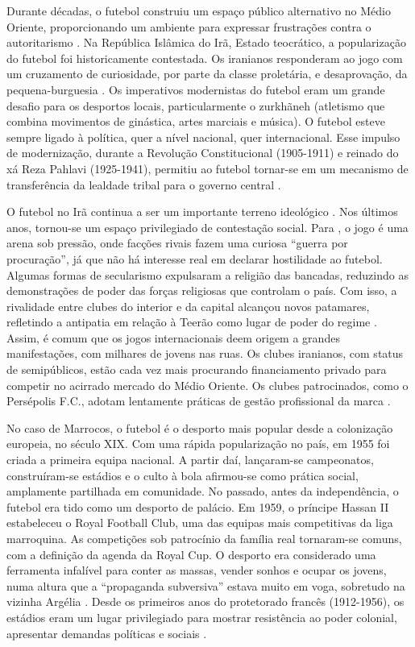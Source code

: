 \documentclass{textolivre}
\begin{document}
Durante décadas, o futebol construiu um espaço público alternativo no Médio Oriente, proporcionando um ambiente para expressar frustrações contra o autoritarismo \cite{dorsey2016}. Na República Islâmica do Irã, Estado teocrático, a popularização do futebol foi historicamente contestada. Os iranianos responderam ao jogo com um cruzamento de curiosidade, por parte da classe proletária, e desaprovação, da pequena-burguesia \cite{fozooni2004}. Os imperativos modernistas do futebol eram um grande desafio para os desportos locais, particularmente o zurkhãneh (atletismo que combina movimentos de ginástica, artes marciais e música). O futebol esteve sempre ligado à política, quer a nível nacional, quer internacional. Esse impulso de modernização, durante a Revolução Constitucional (1905-1911) e reinado do xá Reza Pahlavi (1925-1941), permitiu ao futebol tornar-se em um mecanismo de transferência da lealdade tribal para o governo central \cite{chehabi2002}.

O futebol no Irã continua a ser um importante terreno ideológico \cite{fozooni2004}. Nos últimos anos, tornou-se um espaço privilegiado de contestação social. Para \textcite{dousti2013}, o jogo é uma arena sob pressão, onde facções rivais fazem uma curiosa “guerra por procuração”, já que não há interesse real em declarar hostilidade ao futebol. Algumas formas de secularismo expulsaram a religião das bancadas, reduzindo as demonstrações de poder das forças religiosas que controlam o país. Com isso, a rivalidade entre clubes do interior e da capital alcançou novos patamares, refletindo a antipatia em relação à Teerão como lugar de poder do regime \cite{fozooni2004}. Assim, é comum que os jogos internacionais deem origem a grandes manifestações, com milhares de jovens nas ruas. Os clubes iranianos, com status de semipúblicos, estão cada vez mais procurando financiamento privado para competir no acirrado mercado do Médio Oriente. Os clubes patrocinados, como o Persépolis F.C., adotam lentamente práticas de gestão profissional da marca \cite{chehabi2002}.

No caso de Marrocos, o futebol é o desporto mais popular desde a colonização europeia, no século XIX. Com uma rápida popularização no país, em 1955 foi criada a primeira equipa nacional. A partir daí, lançaram-se campeonatos, construíram-se estádios e o culto à bola afirmou-se como prática social, amplamente partilhada em comunidade. No passado, antes da independência, o futebol era tido como um desporto de palácio. Em 1959, o príncipe Hassan II estabeleceu o Royal Football Club, uma das equipas mais competitivas da liga marroquina. As competições sob patrocínio da família real tornaram-se comuns, com a definição da agenda da Royal Cup. O desporto era considerado uma ferramenta infalível para conter as massas, vender sonhos e ocupar os jovens, numa altura que a “propaganda subversiva” estava muito em voga, sobretudo na vizinha Argélia \cite{el-caid2006}. Desde os primeiros anos do protetorado francês (1912-1956), os estádios eram um lugar privilegiado para mostrar resistência ao poder colonial, apresentar demandas políticas e sociais \cite{alami2018}.
\end{document}
